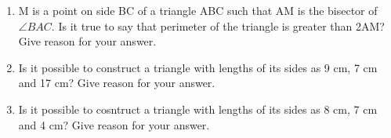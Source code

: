 \documentclass[12pt]{article}
\begin{document}
\begin{enumerate}
\item M is a point on side BC of a triangle ABC such that AM is the bisector of $ \angle{BAC} $. Is it true to say that perimeter of the triangle is greater than 2AM? Give reason for your answer.

\item Is it possible to construct a triangle with lengths of its sides as 9 cm, 7 cm and 17 cm? Give reason for your answer.

\item Is it possible to cosntruct a triangle with lengths of its sides as 8 cm, 7 cm and 4 cm? Give reason for your answer.

\end{enumerate}
\end{document}
